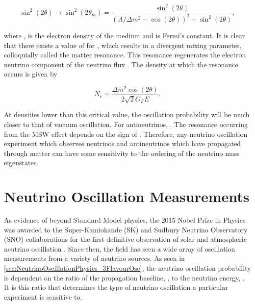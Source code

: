 \begin{equation}
  \label{eq:NeutrinoOscillationPhysics_2Flavour_MSW}
  \sin^{2}(2\theta) \rightarrow \sin^{2}(2\theta_{m}) = \frac{\sin^{2}(2\theta)}{(A/\Delta m^{2} - \cos(2\theta))^{2} + \sin^{2}(2\theta)},
\end{equation}

where ,  is the electron density of the medium and  is Fermi's constant. It is clear that there exists a value of  for , which results in a divergent mixing parameter, colloquially called the matter resonance. This resonance regenerates the electron neutrino component of the neutrino flux \cite{Smirnov2003-yb, msw, wolfenstein}. The density at which the resonance occurs is given by

\begin{equation}
  \label{eq:NeutrinoOscillationPhysics_ResonanceDensity}
  N_{e} = \frac{\Delta m^{2} \cos(2\theta)}{2\sqrt{2} G_{F} E}.
\end{equation}

At densities lower than this critical value, the oscillation probability will be much closer to that of vacuum oscillation. For antineutrinos,  \cite{Barger:1980tf}. The resonance occurring from the MSW effect depends on the sign of . Therefore, any neutrino oscillation experiment which observes neutrinos and antineutrinos which have propagated through matter can have some sensitivity to the ordering of the neutrino mass eigenstates.

\section{Neutrino Oscillation Measurements}
\label{sec:NeutrinoOscillationPhysics_OscillationMeasurements}

As evidence of beyond Standard Model physics, the 2015 Nobel Prize in Physics was awarded to the Super-Kamiokande (SK) \cite{PhysRevLett.93.101801} and Sudbury Neutrino Observatory (SNO) \cite{PhysRevLett.89.011301} collaborations for the first definitive observation of solar and atmospheric neutrino oscillation \cite{2015NobelPhysicsPrize}. Since then, the field has seen a wide array of oscillation measurements from a variety of neutrino sources. As seen in \autoref{sec:NeutrinoOscillationPhysics_3FlavourOsc}, the neutrino oscillation probability is dependent on the ratio of the propagation baseline, , to the neutrino energy, . It is this ratio that determines the type of neutrino oscillation a particular experiment is sensitive to.

